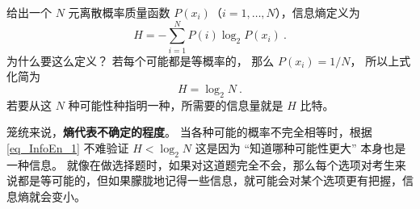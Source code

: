 
\begin{issues}
\issueDraft
\end{issues}

给出一个 $N$ 元离散概率质量函数 $P(x_i)$（$i=1,\dots,N$），信息熵定义为
\begin{equation}\label{eq_InfoEn_1}
H = -\sum_{i=1}^N P(i) \log_2 P(x_i)~.
\end{equation}
为什么要这么定义？ 若每个可能都是等概率的， 那么 $P(x_i) = 1/N$， 所以上式化简为
\begin{equation}
H = \log_2 N~.
\end{equation}
若要从这 $N$ 种可能性种指明一种，所需要的信息量就是 $H$ 比特。

笼统来说，\textbf{熵代表不确定的程度}。 当各种可能的概率不完全相等时，根据\autoref{eq_InfoEn_1} 不难验证 $H < \log_2 N$ 这是因为 “知道哪种可能性更大” 本身也是一种信息。 就像在做选择题时，如果对这道题完全不会，那么每个选项对考生来说都是等可能的，但如果朦胧地记得一些信息，就可能会对某个选项更有把握，信息熵就会变小。
